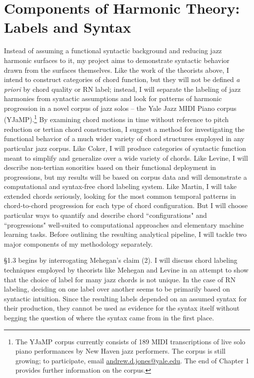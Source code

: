 \section{Components of Harmonic Theory: Labels and Syntax}
Instead of assuming a functional syntactic background and reducing jazz harmonic surfaces to it, my project aims to demonstrate syntactic behavior drawn from the surfaces themselves.  Like the work of the theorists above, I intend to construct categories of chord function, but they will not be defined \emph{a priori} by chord quality or RN label; instead, I will separate the labeling of jazz harmonies from syntactic assumptions and look for patterns of harmonic progression in a novel corpus of jazz solos -- the Yale Jazz MIDI Piano corpus (YJaMP).\footnote{The YJaMP corpus currently consists of 189 MIDI transcriptions of live solo piano performances by New Haven jazz performers.  The corpus is still growing; to participate, email \href{mailto:andrew.d.jones@yale.edu}{andrew.d.jones@yale.edu}.  The end of Chapter 1 provides further information on the corpus.}  By examining chord motions in time without reference to pitch reduction or tertian chord construction, I suggest a method for investigating the functional behavior of a much wider variety of chord structures employed in any particular jazz corpus.  Like Coker, I will produce categories of syntactic function meant to simplify and generalize over a wide variety of chords.  Like Levine, I will describe non-tertian sonorities based on their functional deployment in progressions, but my results will be based on corpus data and will demonstrate a computational and syntax-free chord labeling system.  Like Martin, I will take extended chords seriously, looking for the most common temporal patterns in chord-to-chord progression for each type of chord configuration.  But I will choose particular ways to quantify and describe chord ``configurations" and ``progressions" well-suited to computational approaches and elementary machine learning tasks.  Before outlining the resulting analytical pipeline, I will tackle two major components of my methodology separately.

\S 1.3 begins by interrogating Mehegan's claim (2).  I will discuss chord labeling techniques employed by theorists like Mehegan and Levine in an attempt to show that the choice of label for many jazz chords is not unique.  In the case of RN labeling, deciding on one label over another seems to be primarily based on syntactic intuition.  Since the resulting labels depended on an assumed syntax for their production, they cannot be used as evidence for the syntax itself without begging the question of where the syntax came from in the first place.


